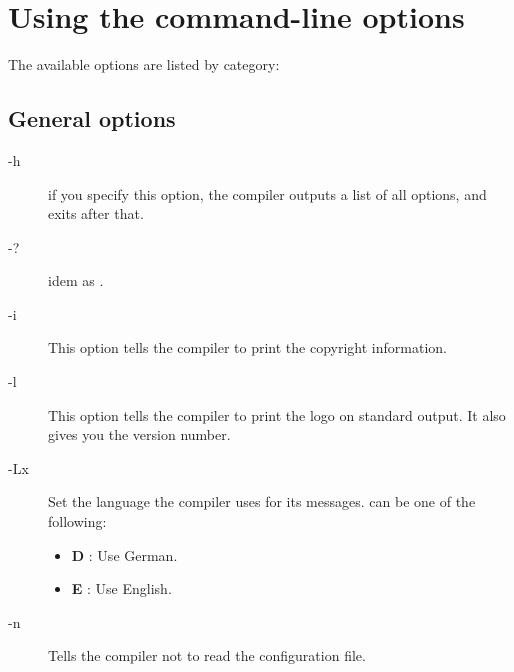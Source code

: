 \documentclass{report}
\newcommand{\olabel}[1]{\label{option:#1}}
\begin{document}
\section{Using the command-line options}

The available options are listed by category:

%
%

\subsection{General options}
\begin{description}
\item[-h] if you specify this option, the compiler outputs a list of all options, 
and exits after that.
\olabel{h}
\item[-?] idem as .
\item[-i] This option tells the compiler to print the copyright information.
\olabel{i}
\item[-l] This option tells the compiler to print the \fpc logo on standard
output. It also gives you the \fpc version number.
\olabel{l}
\item[-Lx] Set the language the compiler uses for its messages. 
\olabel{L}
 can be one of the following:
\begin{itemize}
\item \textbf{D} : Use German.
\item \textbf{E} : Use English.
\end{itemize}
\item [-n] Tells the compiler not to read the configuration file.
\olabel{n}
\end{description}

%
%
\end{document}

